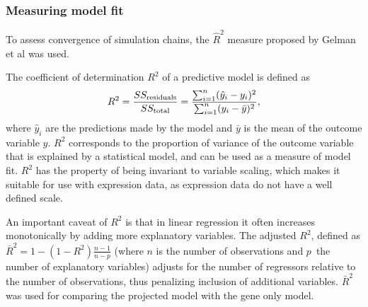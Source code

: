 \subsubsection{Measuring model fit}

To assess convergence of simulation chains, the $\hat{R}^2$ measure proposed
by Gelman et al was used.

The coefficient of determination $R^2$ of a predictive model is defined as
\begin{equation}
	R^2 = \frac{SS_{\textup{residuals}}}{SS_{\textup{total}}} = \frac{\sum_{i=1}^{n}(\hat{y}_i-y_i)^2}{\sum_{i=1}^{n}(y_i-\bar{y})^2},
\end{equation}
where $\hat{y}_i$ are the predictions made by the model and $\bar{y}$ is the
mean of the outcome variable $y$. $R^2$ corresponds to the proportion of variance
of the outcome variable that is explained by a statistical model, and can be
used as a measure of model fit. $R^2$ has the property of being invariant to
variable scaling, which makes it suitable for use with expression data, as
expression data do not have a well defined scale.

An important caveat of $R^2$ is that in linear regression it often increases
monotonically by adding more explanatory variables. The adjusted $R^2$,
defined as $\bar{R}^2 = 1-(1-R^2)\frac{n-1}{n-p}$ (where $n$ is the number of
observations and $p$ the number of explanatory variables) adjusts for the
number of regressors relative to the number of observations, thus penalizing
inclusion of additional variables. $\bar{R}^2$ was used for comparing the
projected model with the gene only model.
